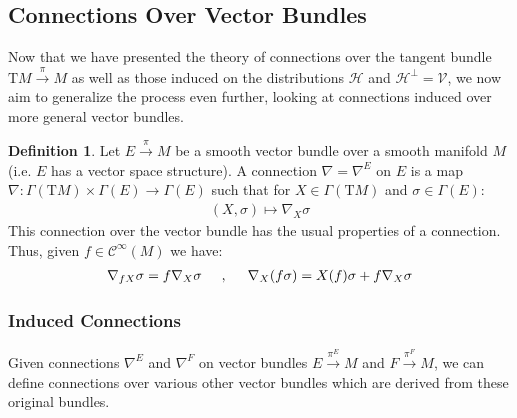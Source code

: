 \documentclass[12pt]{article}
\theoremstyle{definition}
\newtheorem{definition}{Definition}[section]
\numberwithin{equation}{subsection}
\begin{document}
\subsection{Connections Over Vector Bundles}
Now that we have presented the theory of connections over the tangent bundle $\text{T}M \overset{\pi}{\longrightarrow} M$ as well as those induced on the distributions $\mathcal{H}$ and $\mathcal{H}^\perp = \mathcal{V}$, we now aim to generalize the process even further, looking at connections induced over more general vector bundles.

\begin{definition}
Let $E \overset{\pi}{\longrightarrow} M$ be a smooth vector bundle over a smooth manifold $M$ (i.e. $E$ has a vector space structure). A connection $\nabla = \nabla^E$ on $E$ is a map $\nabla: \Gamma(\text{T}M) \times \Gamma(E) \rightarrow \Gamma(E)$ such that for $X \in \Gamma(\text{T}M)$ and $\sigma \in \Gamma(E):$
\begin{align}
    (X, \sigma) \mapsto \nabla_X \sigma
\end{align}
This connection over the vector bundle has the usual properties of a connection. Thus, given $f \in \mathcal{C}^\infty(M)$ we have:
\begin{align}
    \nabla_{fX} \sigma = f \nabla_X \sigma \hspace{.5cm} , \hspace{.5cm} \nabla_X(f \sigma) = X(f) \sigma + f \nabla_X \sigma
\end{align}
\end{definition}
\subsubsection{Induced Connections} \label{sec:indConnect}
Given connections $\nabla^E$ and $\nabla^F$ on vector bundles  $E \overset{\pi^E}{\longrightarrow} M$ and  $F \overset{\pi^F}{\longrightarrow} M$, we can define connections over various other vector bundles which are derived from these original bundles.
\end{document}
